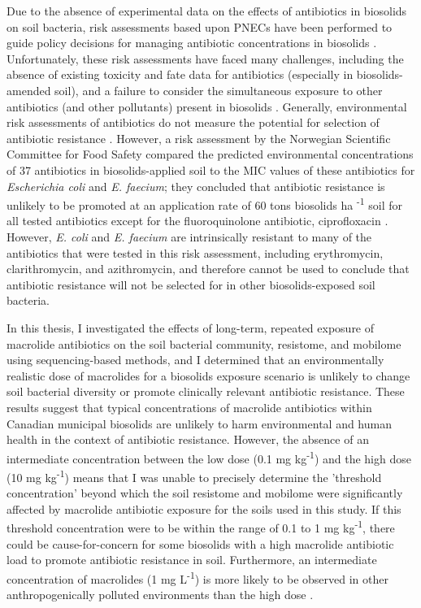 Due to the absence of experimental data on the effects of antibiotics in biosolids on soil bacteria, risk assessments based upon PNECs have been performed to guide policy decisions for managing antibiotic concentrations in biosolids \parencite{Jensen.2012, Eriksen.2009}.
Unfortunately, these risk assessments have faced many challenges, including the absence of existing toxicity and fate data for antibiotics (especially in biosolids-amended soil), and a failure to consider the simultaneous exposure to other antibiotics (and other pollutants) present in biosolids \parencite{McCarthy.2015}.
Generally, environmental risk assessments of antibiotics do not measure the potential for selection of antibiotic resistance \parencite{Lee.2019}.
However, a risk assessment by the Norwegian Scientific Committee for Food Safety compared the predicted environmental concentrations of 37 antibiotics in biosolids-applied soil to the MIC values of these antibiotics for \textit{Escherichia coli} and \textit{E. faecium};
they concluded that antibiotic resistance is unlikely to be promoted at an application rate of 60 tons biosolids ha \textsuperscript{-1} soil for all tested antibiotics except for the fluoroquinolone antibiotic, ciprofloxacin \parencite{Eriksen.2009}.
However, \textit{E. coli} and \textit{E. faecium} are intrinsically resistant to many of the antibiotics that were tested in this risk assessment, including erythromycin, clarithromycin, and azithromycin, and therefore cannot be used to conclude that antibiotic resistance will not be selected for in other biosolids-exposed soil bacteria.

In this thesis, I investigated the effects of long-term, repeated exposure of macrolide antibiotics on the soil bacterial community, resistome, and mobilome using sequencing-based methods, and I determined that an environmentally realistic dose of macrolides for a biosolids exposure scenario is unlikely to change soil bacterial diversity or promote clinically relevant antibiotic resistance.
These results suggest that typical concentrations of macrolide antibiotics within Canadian municipal biosolids are unlikely to harm environmental and human health in the context of antibiotic resistance.
However, the absence of an intermediate concentration between the low dose (0.1 mg kg\textsuperscript{-1}) and the high dose (10 mg kg\textsuperscript{-1}) means that I was unable to precisely determine the 'threshold concentration' beyond which the soil resistome and mobilome were significantly affected by macrolide antibiotic exposure for the soils used in this study.
If this threshold concentration were to be within the range of 0.1 to 1 mg kg\textsuperscript{-1}, there could be cause-for-concern for some biosolids with a high macrolide antibiotic load to promote antibiotic resistance in soil.
Furthermore, an intermediate concentration of macrolides (1 mg L\textsuperscript{-1}) is more likely to be observed in other anthropogenically polluted environments than the high dose \parencite{Bielen.2017}.

